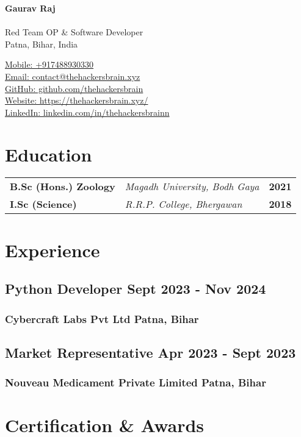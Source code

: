 \documentclass[11pt]{article}
\newcommand{\resumeSubheading}[4]{
    \subsection{#1 \hfill #2}
    \subsubsection{#3 \hfill #4}
    \vspace{8pt}
}
\begin{document}
\begin{center}
    \begin{minipage}{0.4\textwidth}
        {\Huge\bfseries Gaurav Raj} \\
        \\
        Red Team OP \& Software Developer \\
        Patna, Bihar, India
    \end{minipage} \hfill
    \begin{minipage}{0.5\textwidth}
        \raggedleft
        \href{tel:+917488930330}{Mobile: +917488930330} \\
        \href{mailto:contact@thehackersbrain.xyz}{Email: contact@thehackersbrain.xyz} \\
        \href{https://github.com/thehackersbrain}{GitHub: github.com/thehackersbrain} \\
        \href{https://thehackersbrain.xyz/}{Website: https://thehackersbrain.xyz/} \\
        \href{https://www.linkedin.com/in/thehackersbrainn}{LinkedIn: linkedin.com/in/thehackersbrainn}
    \end{minipage}
\end{center}

\section{Education}

\begin{tabular}{@{} p{} p{} r @{}}
    \textbf{B.Sc (Hons.) Zoology} & \textit{Magadh University, Bodh Gaya} & \textbf{2021} \\
    \textbf{I.Sc (Science)} & \textit{R.R.P. College, Bhergawan} & \textbf{2018} \\
\end{tabular}

\section{Experience}

\resumeSubheading
    {Python Developer}{Sept 2023 - Nov 2024}
    {Cybercraft Labs Pvt Ltd}{Patna, Bihar}

\resumeSubheading
    {Market Representative}{Apr 2023 - Sept 2023}
    {Nouveau Medicament Private Limited}{Patna, Bihar}

\section{Certification \& Awards}
\end{document}

